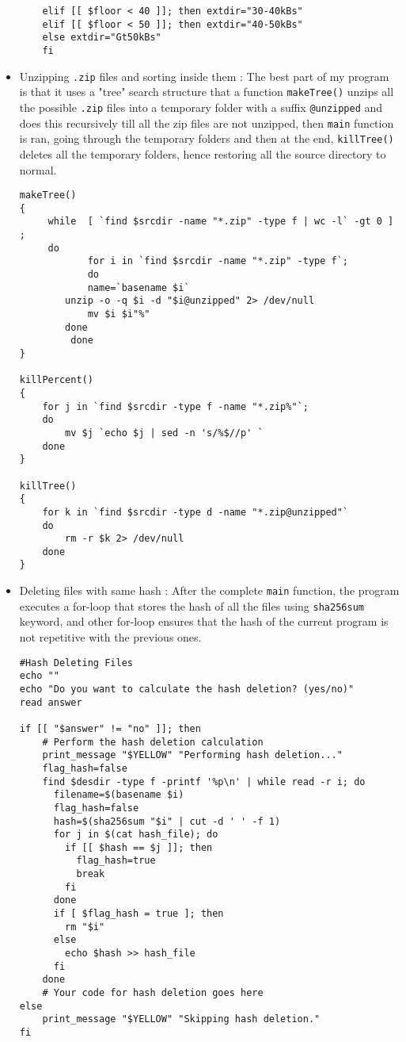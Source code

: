 \documentclass{article}
\begin{document}
\begin{itemize}
\begin{verbatim}
    elif [[ $floor < 40 ]]; then extdir="30-40kBs"
    elif [[ $floor < 50 ]]; then extdir="40-50kBs"
    else extdir="Gt50kBs"
    fi
  \end{verbatim}
  \item Unzipping \texttt{.zip} files and sorting inside them : The best part of my program is that it uses a "tree" search structure that a function \texttt{makeTree()} unzips all the possible \texttt{.zip} files into a temporary folder with a suffix \texttt{@unzipped} and does this recursively till all the zip files are not unzipped, then \texttt{main} function is ran, going through the temporary folders and then at the end, \texttt{killTree()} deletes all the temporary folders, hence restoring all the source directory to normal.
  \begin{verbatim}
makeTree()
{
	 while  [ `find $srcdir -name "*.zip" -type f | wc -l` -gt 0 ] ;
	 do
     		for i in `find $srcdir -name "*.zip" -type f`;
     		do
         	name=`basename $i`
		unzip -o -q $i -d "$i@unzipped" 2> /dev/null
         	mv $i $i"%"
		done
         done
}

killPercent()
{
	for j in `find $srcdir -type f -name "*.zip%"`;
	do
		mv $j `echo $j | sed -n 's/%$//p' ` 
	done
}

killTree()
{
	for k in `find $srcdir -type d -name "*.zip@unzipped"`
	do
		rm -r $k 2> /dev/null
	done
}

  \end{verbatim}
  \item Deleting files with same hash : After the complete \texttt{main} function, the program executes a for-loop that stores the hash of all the files using \texttt{sha256sum} keyword, and other for-loop ensures that the hash of the current program is not repetitive with the previous ones.
  \begin{verbatim}
#Hash Deleting Files
echo ""
echo "Do you want to calculate the hash deletion? (yes/no)"
read answer

if [[ "$answer" != "no" ]]; then
    # Perform the hash deletion calculation
    print_message "$YELLOW" "Performing hash deletion..."
    flag_hash=false
    find $desdir -type f -printf '%p\n' | while read -r i; do
      filename=$(basename $i)
      flag_hash=false
      hash=$(sha256sum "$i" | cut -d ' ' -f 1)
      for j in $(cat hash_file); do
        if [[ $hash == $j ]]; then
          flag_hash=true
          break
        fi
      done
      if [ $flag_hash = true ]; then
        rm "$i"
      else
        echo $hash >> hash_file
      fi
    done
    # Your code for hash deletion goes here
else
    print_message "$YELLOW" "Skipping hash deletion."
fi
  \end{verbatim}
  \end{itemize}
\end{document}
